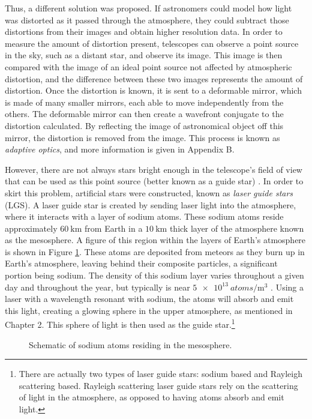 Thus, a different solution was proposed. If astronomers could model how light was distorted as it passed through the atmosphere, they could subtract those distortions from their images and obtain higher resolution data. In order to measure the amount of distortion present, telescopes can observe a point source in the sky, such as a distant star, and observe its image. This image is then compared with the image of an ideal point source not affected by atmospheric distortion, and the difference between these two images represents the amount of distortion. Once the distortion is known, it is sent to a deformable mirror, which is made of many smaller mirrors, each able to move independently from the others. The deformable mirror can then create a wavefront conjugate to the distortion calculated. By reflecting the image of astronomical object off this mirror, the distortion is removed from the image. This process is known as \textit{adaptive optics}, and more information is given in Appendix B.


However, there are not always stars bright enough in the telescope's field of view that can be used as this point source (better known as a guide star) \cite{Wizinowich2006}. In order to skirt this problem, artificial stars were constructed, known as \textit{laser guide stars} (LGS). A laser guide star is created by sending laser light into the atmosphere, where it interacts with a layer of sodium atoms. These sodium atoms reside approximately $\SI{60}{\kilo\meter}$ from Earth in a $\SI{10}{\kilo\meter}$ thick layer of the atmosphere known as the mesosphere. A figure of this region within the layers of Earth's atmosphere is shown in Figure \ref{fig:mesosphere}. These atoms are deposited from meteors as they burn up in Earth's atmosphere, leaving behind their composite particles, a significant portion being sodium. The density of this sodium layer varies throughout a given day and throughout the year, but typically is near $\SI{5e13}{atoms \per \meter \cubed}$ \cite{Kibblewhite2009}. Using a laser with a wavelength resonant with sodium,  the atoms will absorb and emit this light, creating a glowing sphere in the upper atmosphere, as mentioned in Chapter 2. This sphere of light is then used as the guide star.\footnote{There are actually two types of laser guide stars: sodium based and Rayleigh scattering based. Rayleigh scattering laser guide stars rely on the scattering of light in the atmosphere, as opposed to having atoms absorb and emit light.}

\begin{figure}
		\center
		
	\caption{Schematic of sodium atoms residing in the mesosphere.}
	\label{fig:mesosphere}
\end{figure}



